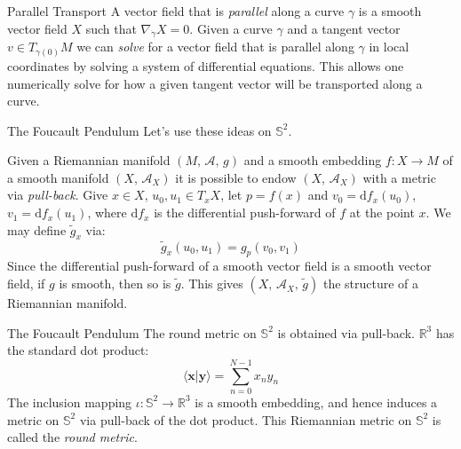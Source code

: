 \documentclass{beamer}
\begin{document}
    \begin{frame}{Parallel Transport}
        A vector field that is \textit{parallel} along a curve $\gamma$ is a
        smooth vector field $X$ such that $\nabla_{\dot{\gamma}}X=0$. Given a
        curve $\gamma$ and a tangent vector $v\in{T}_{\gamma(0)}M$ we can
        \textit{solve} for a vector field that is parallel along $\gamma$ in
        local coordinates by solving a system of differential equations. This
        allows one numerically solve for how a given tangent vector will be
        transported along a curve.
    \end{frame}
    \begin{frame}{The Foucault Pendulum}
        Let's use these ideas on $\mathbb{S}^{2}$.
        \par\hfill\par
        Given a Riemannian manifold $(M,\,\mathcal{A},\,g)$
        and a smooth embedding
        $f:X\rightarrow{M}$ of a smooth manifold $(X,\,\mathcal{A}_{X})$ it is
        possible to endow $(X,\,\mathcal{A}_{X})$ with a metric via
        \textit{pull-back}. Give $x\in{X}$, $u_{0},u_{1}\in{T}_{x}X$, let
        $p=f(x)$ and $v_{0}=\textrm{d}f_{x}(u_{0})$,
        $v_{1}=\textrm{d}f_{x}(u_{1})$, where $\textrm{d}f_{x}$ is the
        differential push-forward of $f$ at the point $x$. We may define
        $\tilde{g}_{x}$ via:
        \begin{equation}
            \tilde{g}_{x}(u_{0},u_{1})=g_{p}(v_{0},v_{1})
        \end{equation}
        Since the differential push-forward of a smooth vector field is a
        smooth vector field, if $g$ is smooth, then so is $\tilde{g}$. This
        gives $(X,\,\mathcal{A}_{X},\,\tilde{g})$ the structure of a Riemannian
        manifold.
    \end{frame}
    \begin{frame}{The Foucault Pendulum}
        The round metric on $\mathbb{S}^{2}$ is obtained via pull-back.
        $\mathbb{R}^{3}$ has the standard dot product:
        \begin{equation}
            \langle\mathbf{x}|\mathbf{y}\rangle
                =\sum_{n=0}^{N-1}{x}_{n}{y}_{n}
        \end{equation}
        The inclusion mapping $\iota:\mathbb{S}^{2}\rightarrow\mathbb{R}^{3}$
        is a smooth embedding, and hence induces a metric on $\mathbb{S}^{2}$
        via pull-back of the dot product. This Riemannian metric on
        $\mathbb{S}^{2}$ is called the \textit{round metric}.
    \end{frame}
\end{document}

